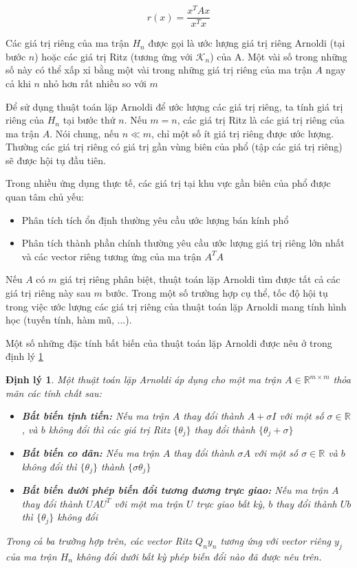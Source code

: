 \documentclass[14pt, a4paper]{article}
\numberwithin{equation}{section}
\numberwithin{algorithm}{section}
\numberwithin{figure}{section}
\newtheorem{dl}{Định lý}
\numberwithin{dl}{section}
\numberwithin{md}{section}
\numberwithin{bd}{section}
\begin{document}
\begin{equation}
    r(x) = \dfrac{x^T A x }{x^T x}
\end{equation}

Các giá trị riêng của ma trận $H_n$ được gọi là ước lượng giá trị riêng Arnoldi (tại bước $n$) hoặc các giá trị Ritz (tương ứng với $\mathcal{K}_n$) của A. Một vài số trong những số này có thể xấp xỉ bằng một vài trong những giá trị riêng của ma trận $A$ ngay cả khi $n$ nhỏ hơn rất nhiều so với $m$

Để sử dụng thuật toán lặp Arnoldi để ước lượng các giá trị riêng, ta tính giá trị riêng của $H_n$ tại bước thứ $n$. Nếu $m=n$, các giá trị Ritz là các giá trị riêng của ma trận $A$. Nói chung, nếu $n \ll m$, chỉ một số ít giá trị riêng được ước lượng. Thường các giá trị riêng có giá trị gần vùng biên của phổ (tập các giá trị riêng) sẽ được hội tụ đầu tiên.

Trong nhiều ứng dụng thực tế, các giá trị tại khu vực gần biên của phổ được quan tâm chủ yếu:

\begin{itemize}
    \item Phân tích tích ổn định thường yêu cầu ước lượng bán kính phổ
    \item Phân tích thành phần chính thường yêu cầu ước lượng giá trị riêng lớn nhất và các vector riêng tương ứng của ma trận $A^T A$
\end{itemize}

Nếu $A$ có $m$ giá trị riêng phân biệt, thuật toán lặp Arnoldi tìm được tất cả các giá trị riêng này sau $m$ bước. Trong một số trường hợp cụ thể, tốc độ hội tụ trong việc ước lượng các giá trị riêng của thuật toán lặp Arnoldi mang tính hình học (tuyến tính, hàm mũ, ...).

Một số những đặc tính bất biến của thuật toán lặp Arnoldi được nêu ở trong định lý \ref{dl:Arnoldi_Properties}

\begin{dl} \label{dl:Arnoldi_Properties}
    Một thuật toán lặp Arnoldi áp dụng cho một ma trận $A \in \mathbb{R}^{m \times m}$ thỏa mãn các tính chất sau:
    \begin{itemize}
        \item \textbf{Bất biến tịnh tiến:} Nếu ma trận $A$ thay đổi thành $A + \sigma I $ với một số $\sigma \in \mathbb{R}$, và $b$ không đổi thì các giá trị Ritz $\lbrace \theta_j \rbrace$ thay đổi thành $\lbrace \theta_j + \sigma \rbrace$
        \item \textbf{Bất biến co dãn:} Nếu ma trận $A$ thay đổi thành $\sigma A$ với một số $\sigma \in \mathbb{R}$ và $b$ không đổi thì $\lbrace \theta_j \rbrace$ thành $\lbrace \sigma \theta_j \rbrace$
        \item \textbf{Bất biến dưới phép biến đổi tương đương trực giao:} Nếu ma trận $A$ thay đổi thành $UAU^T$ với một ma trận $U$ trực giao bất kỳ, $b$ thay đổi thành $Ub$ thì $\lbrace \theta_j \rbrace$ không đổi
    \end{itemize}
    Trong cả ba trường hợp trên, các vector Ritz $Q_n y_n$ tương ứng với vector riêng $y_j$ của ma trận $H_n$ không đổi dưới bất kỳ phép biến đổi nào đã được nêu trên.
\end{dl}
\end{document}
